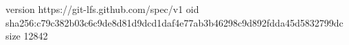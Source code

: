 version https://git-lfs.github.com/spec/v1
oid sha256:c79c382b03c6c9de8d81d9dcd1daf4e77ab3b46298c9d892fdda45d5832799dc
size 12842
